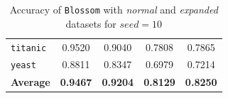 \documentclass[12pt]{report}
\theoremstyle{definition}
\theoremstyle{definition}
\theoremstyle{definition}
\begin{document}
\begin{table}[ht]
\begin{tabular}{lcccc}
    \multicolumn{1}{l}{\tt titanic}       & \multicolumn{1}{c}{0.9520} & \multicolumn{1}{c}{0.9040} & \multicolumn{1}{c}{0.7808} & \multicolumn{1}{c}{0.7865} \\
    \multicolumn{1}{l}{\tt yeast}         & \multicolumn{1}{c}{0.8811} & \multicolumn{1}{c}{0.8347} & \multicolumn{1}{c}{0.6979} & \multicolumn{1}{c}{0.7214} \\
    \hline
    \multicolumn{1}{l}{\bf Average}       & \multicolumn{1}{c}{\bf 0.9467} & \multicolumn{1}{c}{\bf 0.9204} & \multicolumn{1}{c}{\bf 0.8129} & \multicolumn{1}{c}{\bf 0.8250} \\
    \hline
    \end{tabular}
    \caption{Accuracy of \texttt{Blossom} with \textit{normal} and \textit{expanded} datasets for $seed=10$}
    \label{fig:seed10}
\end{table}
\end{document}
